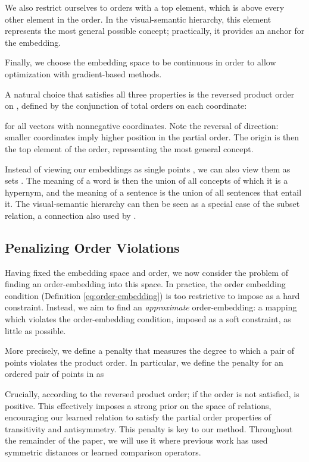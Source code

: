 \documentclass{article} \usepackage{iclr2016_conference,times}
\begin{document}
We also restrict ourselves to orders   with a top element, which is above every other element in the order. In the visual-semantic hierarchy, this element represents the most general possible concept; practically, it provides an anchor for the embedding. 

Finally, we choose the embedding space  to be continuous in order to allow optimization with gradient-based methods.

A natural choice that satisfies all three properties is the reversed product order on , defined by the conjunction of total orders on each coordinate:

for all vectors  with nonnegative coordinates. Note the reversal of direction: smaller coordinates imply higher position in the partial order. The origin is then the top element of the order, representing the most general concept.

Instead of viewing our embeddings as single points , we can also view them as sets .  The meaning of a word is then the union of all concepts of which it is a hypernym, and the meaning of a sentence is the union of all sentences that entail it. The visual-semantic hierarchy can then be seen as a special case of the subset relation, a connection also used by \citet{flickr30k}.

\subsection{Penalizing Order Violations}
Having fixed the embedding space and order, we now consider the problem of finding an order-embedding into this space. 
In practice, the order embedding condition (Definition \ref{eq:order-embedding}) is too restrictive to impose as a hard constraint. Instead, we aim to find an \emph{approximate} order-embedding: a mapping which violates the order-embedding condition, imposed as a soft constraint, as little as possible.




More precisely, we define a penalty that measures the degree to which a pair of points violates the product order. In particular, we define the penalty for an ordered pair  of points in  as

Crucially,  according to the reversed product order; if the order is not satisfied,  is positive. This effectively imposes a strong prior on the space of relations, encouraging our learned relation to satisfy the partial order properties of transitivity and antisymmetry. This penalty is key to our method. Throughout the remainder of the paper, we will use it where previous work has used symmetric distances or learned comparison operators.
\end{document}
